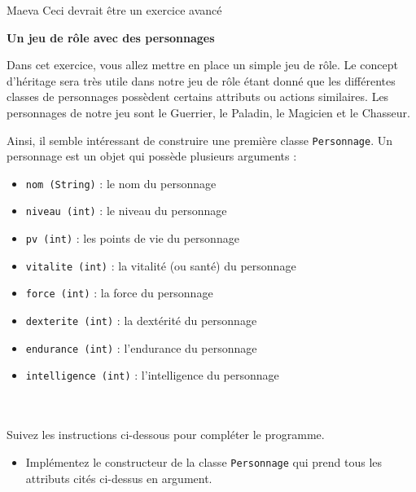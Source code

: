     \begin{note}{Maeva}
        Ceci devrait être un exercice avancé
    \end{note}
    \begin{Exercice}[15 minutes]\textbf{Un jeu de rôle avec des personnages}
    
    Dans cet exercice, vous allez mettre en place un simple jeu de rôle. Le concept d’héritage sera très utile dans notre jeu de rôle étant donné que les différentes classes de personnages possèdent certains attributs ou actions similaires. Les personnages de notre jeu sont le Guerrier, le Paladin, le Magicien et le Chasseur. 
    
    Ainsi, il semble intéressant de construire une première classe \lstinline{Personnage}. Un personnage est un objet qui possède plusieurs arguments :
    \begin{itemize}
        \item \lstinline{nom (String)} : le nom du personnage
        \item \lstinline{niveau (int)} : le niveau du personnage
        \item \lstinline{pv (int)} : les points de vie du personnage
        \item \lstinline{vitalite (int)} : la vitalité (ou santé) du personnage
        \item \lstinline{force (int)} : la force du personnage
        \item \lstinline{dexterite (int)} : la dextérité du personnage
        \item \lstinline{endurance (int)} : l’endurance du personnage
        \item \lstinline{intelligence (int)} : l’intelligence du personnage\\\\\\
    \end{itemize}
    
    Suivez les instructions ci-dessous pour compléter le programme.
    
    \begin{itemize}
        \item Implémentez le constructeur de la classe \lstinline{Personnage} qui prend tous les attributs cités ci-dessus en argument. 
        

\end{itemize}
\end{Exercice}
